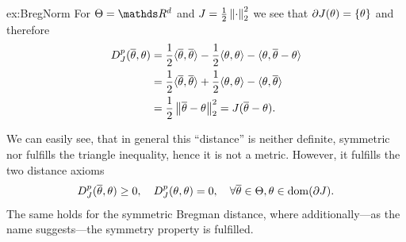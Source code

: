 %
\begin{example}{}{ex:BregNorm}
For $\Param=\R^d$ and $J=\frac{1}{2}\left\|\cdot\right\|_2^2$ we see that $\partial J(\theta) = \{\theta\}$ and therefore
%
\begin{align*}
D_J^p(\overline{\theta}, \theta) &= 
\frac{1}{2}\langle \overline{\theta},\overline{\theta}\rangle - 
\frac{1}{2}\langle \theta,\theta\rangle - \langle \theta, \overline{\theta}-\theta\rangle 
\\&=
\frac{1}{2}\langle \overline{\theta},\overline{\theta}\rangle+
\frac{1}{2}\langle \theta,\theta\rangle -
\langle \theta,\overline{\theta}\rangle
\\&=
\frac{1}{2}\left\|\overline{\theta} - \theta\right\|_2^2 = J(\overline{\theta} - \theta).
\end{align*}
\end{example}
%
\noindent%
We can easily see, that in general this \enquote{distance} is neither definite, symmetric nor fulfills the triangle inequality, hence it is not a metric. 
However, it fulfills the two distance axioms
\begin{align}
D^p_J(\overline{\theta},\theta) \geq 0,\quad D^p_J(\theta,\theta)=0,\quad\forall\overline{\theta}\in\Theta,\theta\in\operatorname{dom}(\partial J).
\end{align}
%
The same holds for the symmetric Bregman distance, where additionally---as the name suggests---the symmetry property is fulfilled.
%
%
